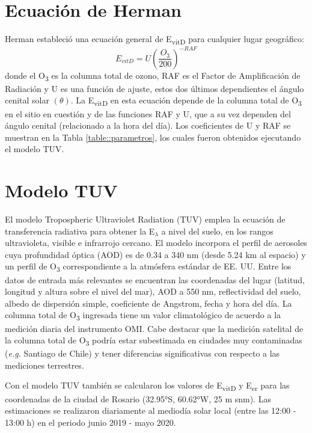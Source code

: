 \documentclass[10pt,twocolumn]{article}
\begin{document}
\section{Ecuación de Herman}
Herman\cite{Herman2010} estableció una ecuación general de E\textsubscript{vitD} para cualquier lugar geográfico:
\begin{equation}
  E_{vitD}=U\left(\frac{O_3}{200}\right)^{-RAF}
  \label{eq:evitd}
\end{equation}
donde el O\textsubscript{3} es la columna total de ozono, RAF es el Factor de Amplificación de Radiación y U es una función de ajuste, estos dos últimos dependientes el ángulo cenital solar $(\theta)$. La E\textsubscript{vitD} en esta ecuación depende de la columna total de O\textsubscript{3} en el sitio en cuestión y de las funciones RAF y U, que a su vez dependen del ángulo cenital (relacionado a la hora del día). Los coeficientes de U y RAF se muestran en la Tabla \ref{table::parametros}, los cuales fueron obtenidos ejecutando el modelo TUV.

\section{Modelo TUV}
El modelo Tropospheric Ultraviolet Radiation (TUV)\cite{Madronich1987} emplea la ecuación de transferencia radiativa para obtener la E$_\lambda$ a nivel del suelo, en los rangos ultravioleta, visible e infrarrojo cercano. El modelo incorpora el perfil de aerosoles cuya profundidad óptica (AOD) es de 0.34 a 340 nm (desde 5.24 km al espacio) y un perfil de O\textsubscript{3} correspondiente a la atmósfera estándar de EE. UU. Entre los datos de entrada más relevantes se encuentran las coordenadas del lugar (latitud, longitud y altura sobre el nivel del mar), AOD a 550 nm, reflectividad del suelo, albedo de dispersión simple, coeficiente de Angstrom, fecha y hora del día. La columna total de O\textsubscript{3} ingresada tiene un valor climatológico de acuerdo a la medición diaria del instrumento OMI. Cabe destacar que la medición satelital de la columna total de O\textsubscript{3} podría estar subestimada en ciudades muy contaminadas (\emph{e.g.} Santiago de Chile) y tener diferencias significativas con respecto a las mediciones terrestres.

Con el modelo TUV también se calcularon los valores de E\textsubscript{vitD} y E\textsubscript{er} para las coordenadas de la ciudad de Rosario (32.95°S, 60.62°W, 25 m snm). Las estimaciones se realizaron diariamente al mediodía solar local (entre las 12:00 - 13:00 h) en el periodo junio 2019 - mayo 2020.
\end{document}
